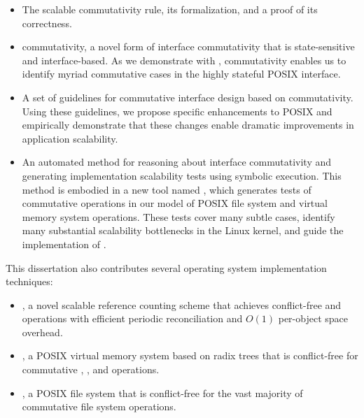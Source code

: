 \begin{itemize}

\item The scalable commutativity rule, its formalization, and a proof
  of its correctness.

\item \SIM commutativity, a novel form of interface commutativity that
  is state-sensitive and interface-based.  As we demonstrate with
  \tool, \SIM commutativity enables us to identify myriad commutative
  cases in the highly stateful POSIX interface.

\item A set of guidelines for commutative interface design based on
  \SIM commutativity.  Using these guidelines, we propose specific
  enhancements to POSIX and empirically demonstrate that these changes
  enable dramatic improvements in application scalability.

\item An automated method for reasoning about interface commutativity
  and generating implementation scalability tests using symbolic
  execution.  This method is embodied in a new tool named \tool, which
  generates  tests of commutative operations
  in our model of  POSIX file system and
  virtual memory system operations.  These tests cover many subtle
  cases, identify many substantial scalability bottlenecks in the
  Linux kernel, and guide the implementation of \sys.

\end{itemize}

\noindent
This dissertation also contributes several operating system
implementation techniques:

\begin{itemize}

\item {}, a novel scalable reference counting scheme that
  achieves conflict-free  and 
  operations with efficient periodic reconciliation and $O(1)$
  per-object space overhead.

\item \vm, a POSIX virtual memory system based on radix trees that is
  conflict-free for commutative , , and
   operations.

\item \fs, a POSIX file system that is conflict-free for the vast
  majority of commutative file system operations.

\end{itemize}

